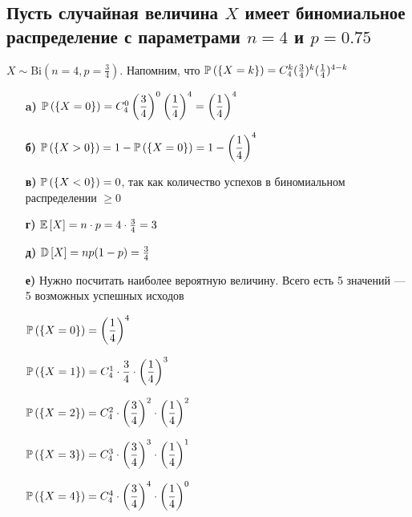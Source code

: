 \documentclass{article}
\begin{document}
\subsection{Пусть случайная величина $X$ имеет биномиальное распределение с параметрами $n = 4$ и $p = 0.75$}
$X\sim\text{Bi}(n=4,p=\frac{3}{4})$. Напомним, что $\mathbb{P}\left(\{X=k\}\right)=C_4^k (\frac{3}{4})^k(\frac{1}{4})^{4-k}$
\begin{itemize}
    \item[\textbf{a)}] $\mathbb{P}\left(\{X=0\}\right)=C_4^0 \left(\displaystyle\frac{3}{4}\right)^0\left(\displaystyle\frac{1}{4}\right)^{4}=\left(\displaystyle\frac{1}{4}\right)^4$
    \item[\textbf{б)}] $\mathbb{P}\left(\{X>0\}\right)=1-\mathbb{P}\left(\{X=0\}\right)=1-\left(\displaystyle\frac{1}{4}\right)^4$
    \item[\textbf{в)}] $\mathbb{P}\left(\{X<0\}\right)=0$, так как количество успехов в биномиальном распределении $\geqslant0$
    \item[\textbf{г)}] $\mathbb{E}\left[X\right]=n\cdot p=4\cdot\frac{3}{4}=3$
    \item[\textbf{д)}] $\mathbb{D}\left[X\right]=np(1-p)=\frac{3}{4}$
    \item[\textbf{е)}] Нужно посчитать наиболее вероятную величину. Всего есть 5 значений — 5 возможных успешных исходов
    
    $\mathbb{P}\left(\{X=0\}\right)=\left(\displaystyle\frac{1}{4}\right)^4$
    
    $\mathbb{P}\left(\{X=1\}\right)=C_4^1\cdot\displaystyle\frac{3}{4}\cdot\left(\frac{1}{4}\right)^3$

    $\mathbb{P}\left(\{X=2\}\right)=C_4^2\cdot\displaystyle\left(\frac{3}{4}\right)^2\cdot\left(\frac{1}{4}\right)^2$

    $\mathbb{P}\left(\{X=3\}\right)=C_4^3\cdot\displaystyle\left(\frac{3}{4}\right)^3\cdot\left(\frac{1}{4}\right)^1$

    $\mathbb{P}\left(\{X=4\}\right)=C_4^4\cdot\displaystyle\left(\frac{3}{4}\right)^4\cdot\left(\frac{1}{4}\right)^0$

\end{itemize}
\end{document}
